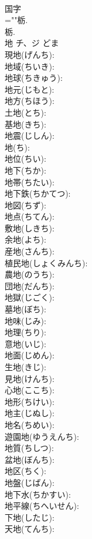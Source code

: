\documentclass[8pt]{extreport}
\begin{document}
\begin{CJK}{UTF8}{min}
\\	国字 
\\	=""栃.
\\	栃.
\\	地	チ、ジ		どま	
\\	現地(げんち): 
\\	地域(ちいき): 
\\	地球(ちきゅう): 
\\	地元(じもと): 
\\	地方(ちほう): 
\\	土地(とち): 
\\	基地(きち): 
\\	地震(じしん): 
\\	地(ち): 
\\	地位(ちい): 
\\	地下(ちか): 
\\	地帯(ちたい): 
\\	地下鉄(ちかてつ): 
\\	地図(ちず): 
\\	地点(ちてん): 
\\	敷地(しきち): 
\\	余地(よち): 
\\	産地(さんち): 
\\	植民地(しょくみんち): 
\\	農地(のうち): 
\\	団地(だんち): 
\\	地獄(じごく): 
\\	墓地(ぼち): 
\\	地味(じみ): 
\\	地理(ちり): 
\\	意地(いじ): 
\\	地面(じめん): 
\\	生地(きじ): 
\\	見地(けんち): 
\\	心地(ここち): 
\\	地形(ちけい): 
\\	地主(じぬし): 
\\	地名(ちめい): 
\\	遊園地(ゆうえんち): 
\\	地質(ちしつ): 
\\	盆地(ぼんち): 
\\	地区(ちく): 
\\	地盤(じばん): 
\\	地下水(ちかすい): 
\\	地平線(ちへいせん): 
\\	下地(したじ): 
\\	天地(てんち): 

\end{CJK}
\end{document}
